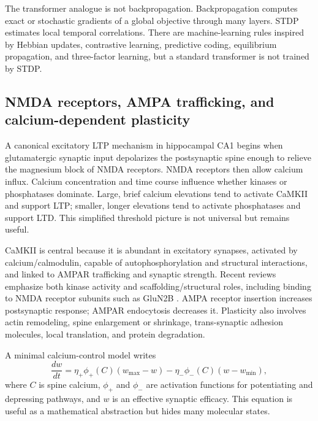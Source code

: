 \documentclass[11pt]{article}
\newcommand{\1}{\mathbf{1}}
\begin{document}
The transformer analogue is not backpropagation. Backpropagation computes exact or stochastic gradients of a global objective through many layers. STDP estimates local temporal correlations. There are machine-learning rules inspired by Hebbian updates, contrastive learning, predictive coding, equilibrium propagation, and three-factor learning, but a standard transformer is not trained by STDP.

\subsection{NMDA receptors, AMPA trafficking, and calcium-dependent plasticity}

A canonical excitatory LTP mechanism in hippocampal CA1 begins when glutamatergic synaptic input depolarizes the postsynaptic spine enough to relieve the magnesium block of NMDA receptors. NMDA receptors then allow calcium influx. Calcium concentration and time course influence whether kinases or phosphatases dominate. Large, brief calcium elevations tend to activate CaMKII and support LTP; smaller, longer elevations tend to activate phosphatases and support LTD. This simplified threshold picture is not universal but remains useful.

CaMKII is central because it is abundant in excitatory synapses, activated by calcium/calmodulin, capable of autophosphorylation and structural interactions, and linked to AMPAR trafficking and synaptic strength. Recent reviews emphasize both kinase activity and scaffolding/structural roles, including binding to NMDA receptor subunits such as GluN2B \cite{Hayashi2022,Nicoll2023,Bayer2025}. AMPA receptor insertion increases postsynaptic response; AMPAR endocytosis decreases it. Plasticity also involves actin remodeling, spine enlargement or shrinkage, trans-synaptic adhesion molecules, local translation, and protein degradation.

A minimal calcium-control model writes
\[
\frac{dw}{dt}=\eta_+\phi_+(C)(w_{\max}-w)-\eta_-\phi_-(C)(w-w_{\min}),
\]
where $C$ is spine calcium, $\phi_+$ and $\phi_-$ are activation functions for potentiating and depressing pathways, and $w$ is an effective synaptic efficacy. This equation is useful as a mathematical abstraction but hides many molecular states.
\end{document}

